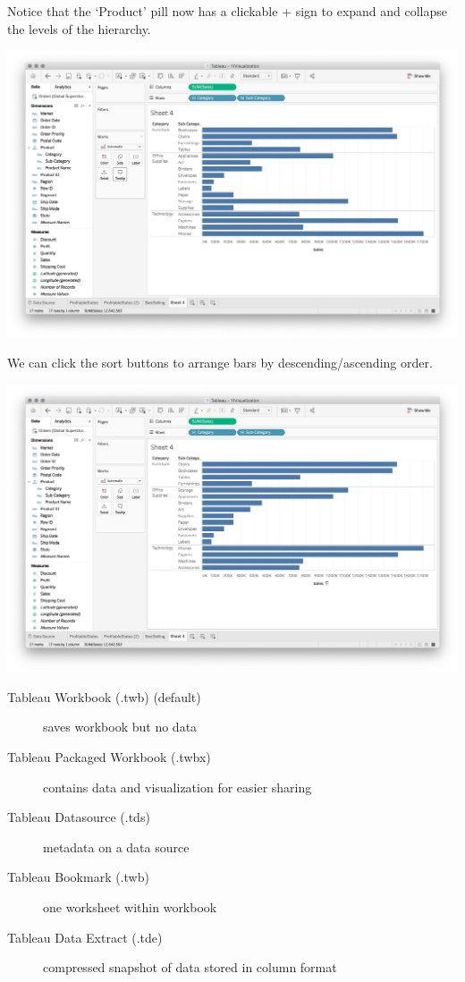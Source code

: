 \documentclass[xcolor=svgnames]{beamer} %
\begin{document}
\begin{frame}
Notice that the `Product' pill now has a clickable + sign to expand and collapse the levels of the hierarchy. 
\begin{center}
\includegraphics[width=.9\textwidth]{img/product}
\end{center}
\end{frame}


\begin{frame}
We can click the sort buttons to arrange bars by descending/ascending order.
\begin{center}
\includegraphics[width=.9\textwidth]{img/sort}
\end{center}
\end{frame}



\begin{frame}
\begin{description}
\item [Tableau Workbook (.twb) (default)]  saves workbook but no data
\item [Tableau Packaged Workbook (.twbx)]  contains data and visualization for easier sharing
\item [Tableau Datasource (.tds)]  metadata on a data source
\item [Tableau Bookmark (.twb)]  one worksheet within workbook
\item [Tableau Data Extract (.tde)]  compressed snapshot of data stored in column format
\end{description}



\end{frame}
\end{document}
